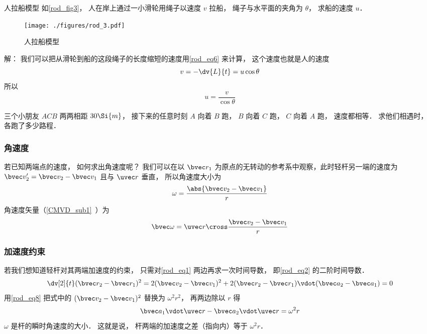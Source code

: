 \begin{example}{人拉船模型}
如\autoref{rod_fig3}， 人在岸上通过一小滑轮用绳子以速度 $v$ 拉船， 绳子与水平面的夹角为 $\theta$， 求船的速度 $u$．
\begin{figure}[ht]
\centering
\texttt{[image: ./figures/rod\_3.pdf]}
\caption{人拉船模型} \label{rod_fig3}
\end{figure}

解： 我们可以把从滑轮到船的这段绳子的长度缩短的速度用\autoref{rod_eq6} 来计算， 这个速度也就是人的速度
\begin{equation}
v = -\dv{L}{t} = u \cos\theta
\end{equation}
所以
\begin{equation}
u = \frac{v}{\cos\theta}
\end{equation}
\end{example}

\begin{exercise}{}
三个小朋友 $ACB$ 两两相距 $30\Si{m}$， 接下来的任意时刻 $A$ 向着 $B$ 跑， $B$ 向着 $C$ 跑， $C$ 向着 $A$ 跑， 速度都相等． 求他们相遇时， 各跑了多少路程．
\end{exercise}

\subsubsection{角速度}

若已知两端点的速度， 如何求出角速度呢？ 我们可以在以 $\bvec r_1$ 为原点的无转动的参考系中观察，此时轻杆另一端的速度为 $\bvec v_2' = \bvec v_2 - \bvec v_1$ 且与 $\uvec r$ 垂直， 所以角速度大小为
\begin{equation}\label{rod_eq8}
\omega = \frac{\abs{\bvec v_2 - \bvec v_1}}{r}
\end{equation}
角速度矢量（\autoref{CMVD_sub1}~）为
\begin{equation}\label{rod_eq4}
\bvec \omega = \uvec r \cross \frac{\bvec v_2 - \bvec v_1}{r}
\end{equation}

\subsubsection{加速度约束}
若我们想知道轻杆对其两端加速度的约束， 只需对\autoref{rod_eq1} 两边再求一次时间导数， 即\autoref{rod_eq2} 的二阶时间导数．
\begin{equation}
\dv[2]{t} (\bvec r_2 - \bvec r_1)^2 = 2(\bvec v_2 - \bvec v_1)^2 + 2(\bvec r_2 - \bvec r_1) \vdot (\bvec a_2 - \bvec a_1) = 0
\end{equation}
用\autoref{rod_eq8} 把式中的 $(\bvec v_2 - \bvec v_1)^2$ 替换为 $\omega^2 r^2$， 再两边除以 $r$ 得
\begin{equation}\label{rod_eq5}
\bvec a_1 \vdot \uvec r - \bvec a_2 \vdot \uvec r  = \omega^2 r
\end{equation}
$\omega$ 是杆的瞬时角速度的大小． 这就是说， 杆两端的加速度之差（指向内）等于 $\omega^2r$．

